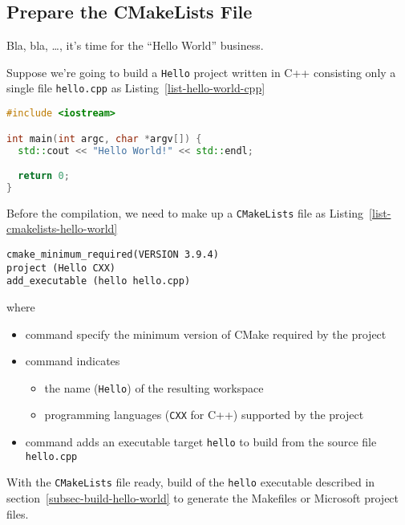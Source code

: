 \subsection{Prepare the CMakeLists File}
  Bla, bla, \dots, it's time for the ``Hello World'' business.\par
  Suppose we're going to build a \texttt{Hello} project written in C++ consisting only a single file \texttt{hello.cpp} as Listing~\ref{list-hello-world-cpp}
\begin{lstlisting}[language=C++,caption={Hello World project in C++},label=list-hello-world-cpp]
#include <iostream>

int main(int argc, char *argv[]) {
  std::cout << "Hello World!" << std::endl;

  return 0;
}
\end{lstlisting}
  Before the compilation, we need to make up a \texttt{CMakeLists} file as Listing~\ref{list-cmakelists-hello-world}
\begin{lstlisting}[caption={CMakeLists for Hello World in C++},label=list-cmakelists-hello-world]
cmake_minimum_required(VERSION 3.9.4)
project (Hello CXX) 
add_executable (hello hello.cpp)
\end{lstlisting}
  where 
  \begin{itemize}  
    \item {} command specify the minimum version of CMake required by the project
    \item {} command indicates 
      \begin{itemize}  
        \item the name (\texttt{Hello}) of the resulting workspace
        \item programming languages (\texttt{CXX} for C++) supported by the project
      \end{itemize}  
    \item {} command adds an executable target \texttt{hello} to build from the source file \texttt{hello.cpp}
  \end{itemize}  
   With the \texttt{CMakeLists} file ready, build of the \texttt{hello} executable described in section~\ref{subsec-build-hello-world} to generate the Makefiles or Microsoft project files.
